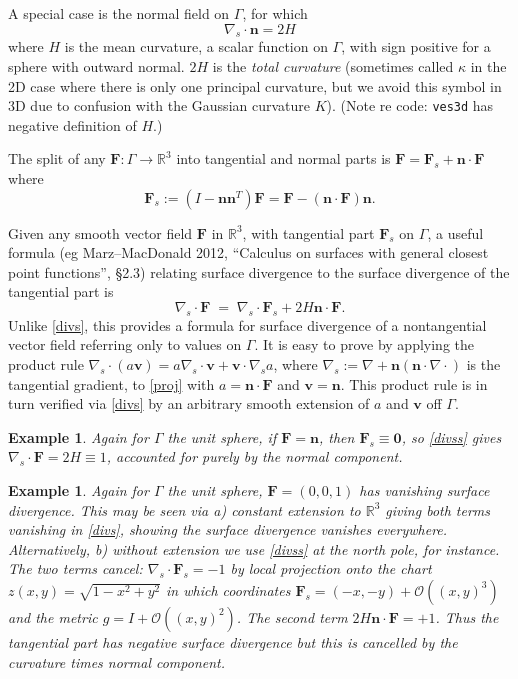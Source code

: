 \documentclass[11pt]{article}
\newcommand{\be}{\begin{equation}}
\newcommand{\ee}{\end{equation}}
\newcommand{\mbf}[1]{{\mathbf #1}}
\newcommand{\bigO}{{\mathcal O}}
\newcommand{\R}{\mathbb{R}}
\newtheorem{exa}[thm]{Example}
\newcommand{\n}{\mbf{n}}
\newcommand{\vv}{\mbf{v}}
\begin{document}
A special case is the normal field on $\Gamma$, for which
\be
\nabla_s\cdot \n = 2H
\label{divsn}
\ee
where $H$ is the mean curvature, a scalar function on $\Gamma$,
with sign positive for a sphere with
outward normal. $2H$ is the {\em total curvature} (sometimes called
$\kappa$ in the 2D case where there is only one principal curvature,
but we avoid this symbol in 3D due to confusion with the Gaussian curvature $K$).
(Note re code: {\tt ves3d} has negative definition of $H$.)

The split of any $\mbf{F}:\Gamma \to \R^3$ into tangential and normal
parts is $\mbf{F} = \mbf{F}_s + \n\cdot\mbf{F}$ where
\be
\mbf{F}_s := (I-\n\n^T)\mbf{F} = \mbf{F} - (\n\cdot\mbf{F})\n
.
\label{proj}
\ee

Given any smooth vector field $\mbf{F}$ in $\R^3$, with tangential part
$\mbf{F}_s$ on $\Gamma$,
a useful formula (eg Marz--MacDonald 2012, ``Calculus on surfaces with general closest point functions'', \S2.3)
relating surface divergence to the surface divergence of the tangential part is
\be
\nabla_s \cdot \mbf{F}
\;=\;
\nabla_s \cdot \mbf{F}_s + 2H \n\cdot \mbf{F}
.
\label{divss}
\ee
Unlike \eqref{divs}, this provides a formula for surface divergence of
a nontangential vector field referring only to values on $\Gamma$.
It is easy to prove by applying the product rule
$\nabla_s\cdot(a\vv) = a \nabla_s\cdot\vv + \vv \cdot \nabla_s a$,
where $\nabla_s := \nabla + \n (\n \cdot \nabla \cdot)$ is the tangential
gradient, to \eqref{proj} with $a = \n\cdot\mbf{F}$ and $\vv=\n$.
This product rule is in turn verified via \eqref{divs} by
an arbitrary smooth extension of $a$ and $\vv$ off $\Gamma$.

\begin{exa}
  Again for $\Gamma$ the unit sphere, if $\mbf{F}=\n$, then $\mbf{F}_s\equiv\mbf{0}$,
  so \eqref{divss} gives $\nabla_s\cdot\mbf{F} = 2H \equiv 1$, accounted
  for purely by the normal component.
\end{exa}
\begin{exa}
  Again for $\Gamma$ the unit sphere,
  $\mbf{F}=(0,0,1)$ has vanishing surface divergence. 
  This may be seen via a) constant extension to $\R^3$ giving
  both terms vanishing in \eqref{divs}, showing the surface divergence
  vanishes everywhere.
  Alternatively, b) without extension
  we use \eqref{divss} at the north pole, for instance.
  The two terms cancel: $\nabla_s\cdot \mbf{F}_s = -1$
  by local projection onto the chart $z(x,y) = \sqrt{1-x^2+y^2}$
  in which coordinates $\mbf{F}_s = (-x,-y) + \bigO((x,y)^3)$ and
  the metric $g = I + \bigO((x,y)^2)$.
  The second term $2H\n\cdot\mbf{F} = +1$.
  Thus the tangential part has negative surface divergence but this
  is cancelled by the curvature times normal component.
  \end{exa}
\end{document}
